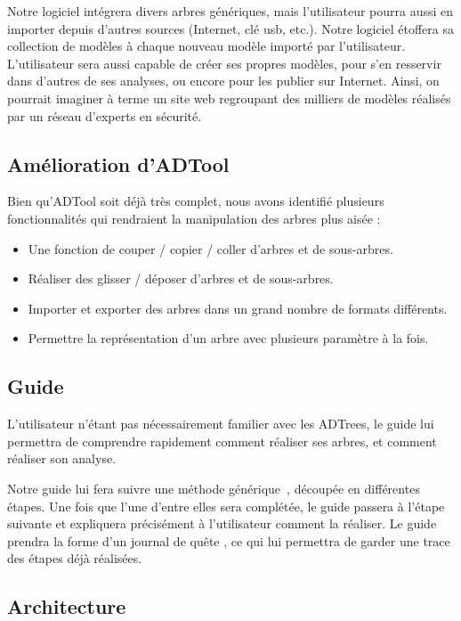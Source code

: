         Notre logiciel intégrera divers arbres génériques, mais l'utilisateur pourra aussi en importer depuis d'autres sources (Internet, clé usb, etc.). Notre logiciel étoffera sa collection de modèles à chaque nouveau modèle importé par l'utilisateur.
        L'utilisateur sera aussi capable de créer ses propres modèles, pour s'en resservir dans d'autres de ses analyses, ou encore pour les publier sur Internet. Ainsi, on pourrait imaginer à terme un site web regroupant des milliers de modèles réalisés par un réseau d'experts en sécurité.

    \subsection{Amélioration d'ADTool}
        \label{sec:adtoolpp}

        Bien qu'ADTool soit déjà très complet, nous avons identifié plusieurs fonctionnalités qui rendraient la manipulation des arbres plus aisée :
        \begin{itemize}
            \item Une fonction de couper / copier / coller d'arbres et de sous-arbres.
            \item Réaliser des glisser / déposer d'arbres et de sous-arbres.
            \item Importer et exporter des arbres dans un grand nombre de formats différents.
            \item Permettre la représentation d'un arbre avec plusieurs paramètre à la fois.
        \end{itemize}

    \subsection{Guide}
        \label{sec:guide}

        L'utilisateur n'étant pas nécessairement familier avec les ADTrees, le guide lui permettra de comprendre rapidement comment réaliser ses arbres, et comment réaliser son analyse.

        Notre guide lui fera suivre une méthode générique~\cite{methode_analyse}, découpée en différentes étapes. Une fois que l'une d'entre elles sera complétée, le guide passera à l'étape suivante et expliquera précisément à l'utilisateur comment la réaliser.
        Le guide prendra la forme d'un \og journal de quête \fg, ce qui lui permettra de garder une trace des étapes déjà réalisées.

    \subsection{Architecture}
        \label{sec:archi}

